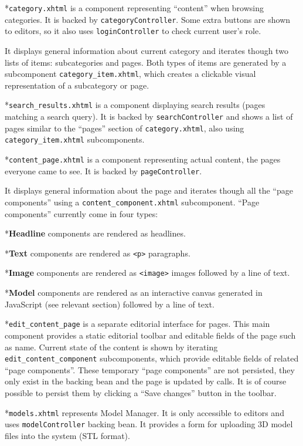 \begitems

*{\tt category.xhtml} is a component representing “content” when browsing categories. It is backed by {\tt categoryController}. Some extra buttons are shown to editors, so it also uses {\tt loginController} to check current user’s role.

It displays general information about current category and iterates though two lists of items: subcategories and pages. Both types of items are generated by a subcomponent {\tt category\_item.xhtml}, which creates a clickable visual representation of a subcategory or page.

*{\tt search\_results.xhtml} is a component displaying search results (pages matching a search query). It is backed by {\tt searchController} and shows a list of pages similar to the “pages” section of {\tt category.xhtml}, also using {\tt category\_item.xhtml} subcomponents.

*{\tt content\_page.xhtml} is a component representing actual content, the pages everyone came to see. It is backed by {\tt pageController}.

It displays general information about the page and iterates though all the “page components” using a {\tt content\_component.xhtml} subcomponent. “Page components” currently come in four types:

\begitems

*{\bf Headline} components are rendered as {\tt <h3>} headlines.

*{\bf Text} components are rendered as {\tt <p>} paragraphs.

*{\bf Image} components are rendered as {\tt <image>} images followed by a line of text.

*{\bf Model} components are rendered as an interactive canvas generated in JavaScript (see relevant section) followed by a line of text.

\enditems

*{\tt edit\_content\_page} is a separate editorial interface for pages. This main component provides a static editorial toolbar and editable fields of the page such as name. Current state of the content is shown by iterating {\tt edit\_content\_component} subcomponents, which provide editable fields of related “page components”. These temporary “page components” are not persisted, they only exist in the backing bean and the page is updated by  calls. It is of course possible to persist them by clicking a “Save changes” button in the toolbar.

*{\tt models.xhtml} represents Model Manager. It is only accessible to editors and uses {\tt modelController} backing bean.
It provides a form for uploading 3D model files into the system (STL format).


